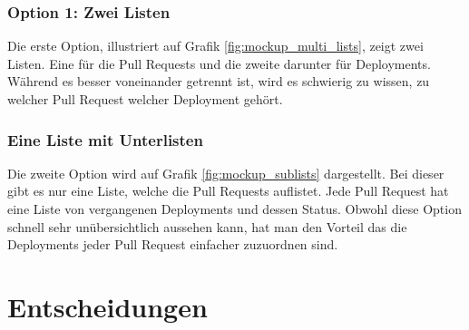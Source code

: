 \begin{minipage}{\textwidth}
    \subsubsection{Option 1: Zwei Listen}
    Die erste Option, illustriert auf Grafik \ref{fig:mockup_multi_lists}, zeigt zwei Listen. Eine für die Pull Requests und
    die zweite darunter für Deployments. \newline
    Während es besser voneinander getrennt ist, wird es schwierig zu wissen, zu welcher Pull Request welcher Deployment
    gehört. \newline
\end{minipage}

\begin{minipage}{\textwidth}
    \subsubsection{Eine Liste mit Unterlisten}
    Die zweite Option wird auf Grafik \ref{fig:mockup_sublists} dargestellt. Bei dieser gibt es nur eine Liste, welche
    die Pull Requests auflistet. Jede Pull Request hat eine Liste von vergangenen Deployments und dessen Status. \newline
    Obwohl diese Option schnell sehr unübersichtlich aussehen kann, hat man den Vorteil das die Deployments jeder
    Pull Request einfacher zuzuordnen sind. \newline
\end{minipage}

\section{Entscheidungen}
